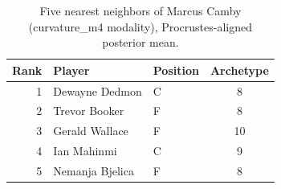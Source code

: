 \begin{table}[htbp]
  \centering\small
  \begin{tabular}{rllc}
    \toprule
    Rank & Player & Position & Archetype \\
    \midrule
    1 & Dewayne Dedmon & C & 8 \\
    2 & Trevor Booker & F & 8 \\
    3 & Gerald Wallace & F & 10 \\
    4 & Ian Mahinmi & C & 9 \\
    5 & Nemanja Bjelica & F & 8 \\
    \bottomrule
  \end{tabular}
  \caption{Five nearest neighbors of Marcus Camby (curvature_m4 modality), Procrustes-aligned posterior mean.}
  \label{tab:Marcus_Camby_neighbors_curvature_m4}
\end{table}

